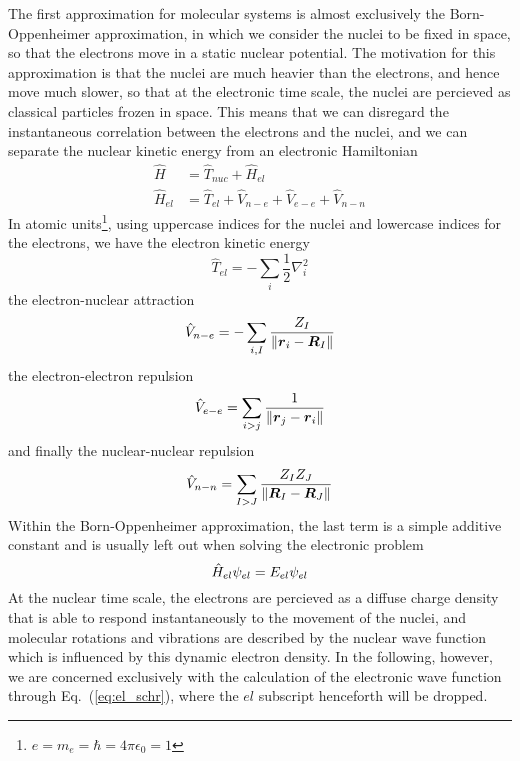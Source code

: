 The first approximation for molecular systems is almost exclusively the Born-Oppenheimer 
approximation\cite{BornOppenheimer},
in which we consider the nuclei to be fixed in space, so that the electrons move in a static
nuclear potential. The motivation for this approximation is that the nuclei are much heavier
than the electrons, and hence move much slower, so that at the electronic time scale, the
nuclei are percieved as classical particles frozen in space. This means that we can disregard the
instantaneous correlation between the electrons and the nuclei, and we can separate the nuclear
kinetic energy from an electronic Hamiltonian
\begin{align}
    \hat{H} &= \hat{T}_{nuc} + \hat{H}_{el}\\
    \hat{H}_{el} &= \hat{T}_{el} + \hat{V}_{n-e} + \hat{V}_{e-e} + \hat{V}_{n-n}
\end{align}
In atomic units\footnote{$e=m_e=\hbar=4\pi\epsilon_0=1$}, using uppercase indices for the
nuclei and lowercase indices for the electrons, we have the electron kinetic energy
\begin{equation}
    \hat{T}_{el} = -\sum_i \frac{1}{2}\nabla_i^2
\end{equation}
the electron-nuclear attraction
\begin{equation}
    \hat{V}_{n-e} = -\sum_{i,I} \frac{Z_I}{\|\boldsymbol r_i-\boldsymbol R_I\|}
\end{equation}
the electron-electron repulsion
\begin{equation}
    \hat{V}_{e-e} = \sum_{i>j} \frac{1}{\|\boldsymbol r_j-\boldsymbol r_i\|}
\end{equation}
and finally the nuclear-nuclear repulsion
\begin{equation}
    \hat{V}_{n-n} = \sum_{I>J} \frac{Z_IZ_J}{\|\boldsymbol R_I-\boldsymbol R_J\|}
\end{equation}
Within the Born-Oppenheimer approximation, the last term is a simple additive constant 
and is usually left out when solving the electronic problem
\begin{equation}
    \label{eq:el_schr}
    \hat{H}_{el}\psi_{el} = E_{el}\psi_{el}
\end{equation}
At the nuclear time scale, the electrons are percieved as a diffuse charge density that is
able to respond instantaneously to the movement of the nuclei, and molecular rotations and 
vibrations are described by the nuclear wave function which is influenced by this dynamic
electron density. In the following, however, we are concerned exclusively with the calculation 
of the electronic wave function through Eq.~(\ref{eq:el_schr}), where the $el$ subscript 
henceforth will be dropped.

